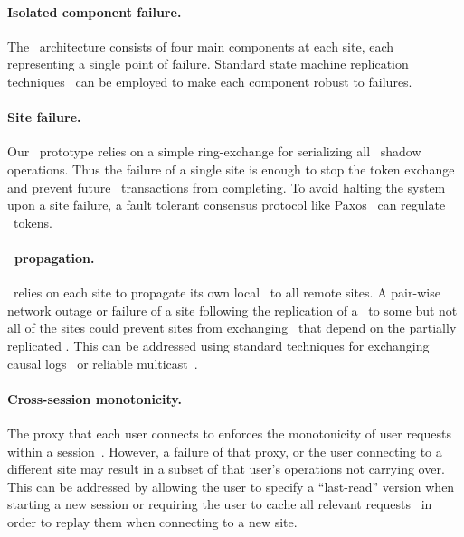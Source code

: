\paragraph{Isolated component failure.}  The \gemini\ architecture consists 
of four main components at each site, each representing a single point
of failure.  Standard state machine replication
techniques~\cite{Lamport1978Time,Schneider1990RSM} can be employed to
make each component robust to failures.

\paragraph{Site failure.} Our \gemini\ prototype relies on a simple 
ring-exchange for serializing all \red\ shadow operations. Thus the failure of a single
site is enough to stop the token exchange and prevent future
\red\ transactions from completing. To avoid halting the system upon a site failure,
a fault tolerant consensus protocol like Paxos~\cite{Lamport1998Paxos}
can regulate \red\ tokens.

\paragraph{\Operation\ propagation.}  \Gemini\ relies on each site to
 propagate its own local \transactions\ to all remote sites.  A
 pair-wise network outage or failure of a site following the
 replication of a \transaction\ to some but not all of the sites
could prevent sites from exchanging
 \transactions\ that depend on the partially replicated \transaction.
 This can be addressed using standard techniques for exchanging
 causal logs~\cite{Mahajan2010Depot, Ahamad1994causalmemory,
   Terry1995Managing, Petersen1997Flexible} or reliable multicast~\cite{Floyd1997Multicast}.

\paragraph{Cross-session monotonicity.} The proxy that each user connects to enforces the
  monotonicity of user requests within a
  session~\cite{Terry1994Session}. However, a
failure of that proxy, or the user connecting to a different site may result in a
subset of that user's operations not carrying over. This can be addressed by allowing the user to
specify a ``last-read'' version when starting a new session or
requiring the user to cache all relevant
requests~\cite{Mahajan2010Depot} in order to replay them when connecting
to a new site.


